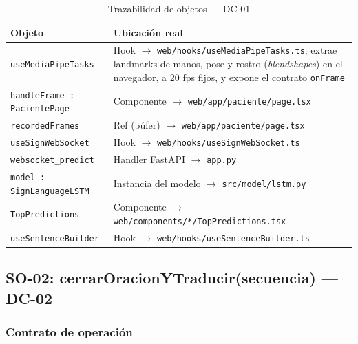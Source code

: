 \begin{table}[H]
\centering
\begin{tabularx}{\textwidth}{@{}l X@{}}
\toprule
\textbf{Objeto} & \textbf{Ubicación real} \\
\midrule
\texttt{useMediaPipeTasks} & Hook $\rightarrow$ \texttt{web/hooks/useMediaPipeTasks.ts}; extrae landmarks de manos, pose y rostro (\textit{blendshapes}) en el navegador, a 20 fps fijos, y expone el contrato \texttt{onFrame} \\
\texttt{handleFrame : PacientePage} & Componente $\rightarrow$ \texttt{web/app/paciente/page.tsx} \\
\texttt{recordedFrames} & Ref (búfer) $\rightarrow$ \texttt{web/app/paciente/page.tsx} \\
\texttt{useSignWebSocket} & Hook $\rightarrow$ \texttt{web/hooks/useSignWebSocket.ts} \\
\texttt{websocket\_predict} & Handler FastAPI $\rightarrow$ \texttt{app.py} \\
\texttt{model : SignLanguageLSTM} & Instancia del modelo $\rightarrow$ \texttt{src/model/lstm.py} \\
\texttt{TopPredictions} & Componente $\rightarrow$ \texttt{web/components/*/TopPredictions.tsx} \\
\texttt{useSentenceBuilder} & Hook $\rightarrow$ \texttt{web/hooks/useSentenceBuilder.ts} \\
\bottomrule
\end{tabularx}
\caption{Trazabilidad de objetos --- DC-01}
\label{tab:col-objetos-dc01}
\end{table}

\subsection{SO-02: cerrarOracionYTraducir(secuencia) --- DC-02}

\subsubsection{Contrato de operación}

